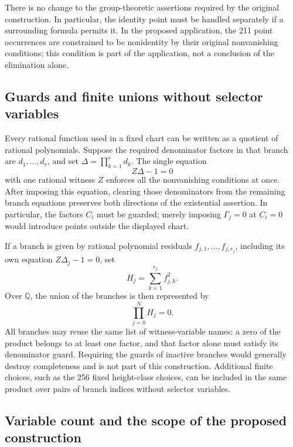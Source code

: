 There is no change to the group-theoretic assertions required by the
original construction.  In particular, the identity point must be
handled separately if a surrounding formula permits it.  In the
proposed application, the 211 point occurrences are constrained to be
nonidentity by their original nonvanishing conditions; this condition
is part of the application, not a conclusion of the elimination alone.

\subsection{Guards and finite unions without selector variables}

Every rational function used in a fixed chart can be written as a
quotient of rational polynomials.  Suppose the required denominator
factors in that branch are $d_1,\ldots,d_r$, and set
$\Delta=\prod_{k=1}^r d_k$.  The single equation
\[
 Z\Delta-1=0
\]
with one rational witness $Z$ enforces all the nonvanishing conditions
at once.  After imposing this equation, clearing those denominators
from the remaining branch equations preserves both directions of
the existential assertion.  In particular, the factors $C_i$ must
be guarded; merely imposing $\Gamma_j=0$ at $C_i=0$ would introduce
points outside the displayed chart.

If a branch is given by rational polynomial residuals
$f_{j,1},\ldots,f_{j,r_j}$, including its own equation
$Z\Delta_j-1=0$, set
\[
 H_j=\sum_{k=1}^{r_j}f_{j,k}^2.
\]
Over $\mathbb Q$, the union of the branches is then represented by
\[
 \prod_{j=0}^{N}H_j=0.
\]
All branches may reuse the same list of witness-variable names: a
zero of the product belongs to at least one factor, and that factor
alone must satisfy its denominator guard.  Requiring the guards of
inactive branches would generally destroy completeness and is not
part of this construction.  Additional finite choices, such as the
256 fixed height-class choices, can be included in the same product
over pairs of branch indices without selector variables.

\subsection{Variable count and the scope of the proposed construction}

